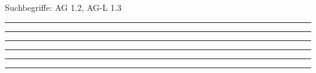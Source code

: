 \documentclass[a4paper,12pt]{report}
\begin{document}

 \scriptsize Suchbegriffe: AG 1.2, AG-L 1.3\normalsize 
 
%
\hrule  \leer

%
\hrule  \leer

%
\hrule  \leer

%
\hrule  \leer

%
\hrule  \leer

%
\hrule  \leer

\end{document}
